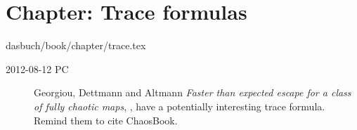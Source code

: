 %
%


\section{Chapter: Trace formulas}
\label{c-trace}\noindent dasbuch/book/chapter/trace.tex
\begin{description}
\item[2012-08-12 PC]
Georgiou, Dettmann and Altmann
\emph{Faster than expected escape for a class of fully chaotic maps}, ,
have a potentially interesting trace formula. Remind them to cite ChaosBook.

\end{description}

%
%
%
%
%

